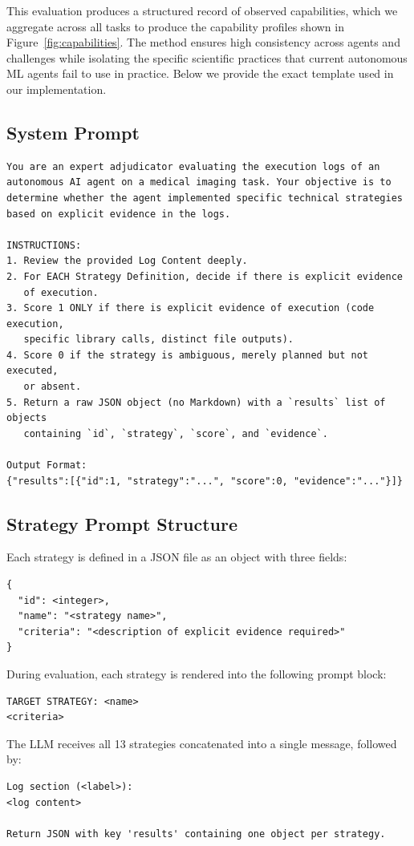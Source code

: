 This evaluation produces a structured record of observed capabilities, which we aggregate  across all tasks to produce the capability profiles shown in Figure~\ref{fig:capabilities}. The method ensures high consistency across agents and challenges while isolating the specific scientific practices that current autonomous ML agents fail to use in practice.
Below we provide the exact template used in our implementation.

\subsection{System Prompt}

\begin{verbatim}
You are an expert adjudicator evaluating the execution logs of an 
autonomous AI agent on a medical imaging task. Your objective is to 
determine whether the agent implemented specific technical strategies 
based on explicit evidence in the logs.

INSTRUCTIONS:
1. Review the provided Log Content deeply.
2. For EACH Strategy Definition, decide if there is explicit evidence 
   of execution.
3. Score 1 ONLY if there is explicit evidence of execution (code execution, 
   specific library calls, distinct file outputs).
4. Score 0 if the strategy is ambiguous, merely planned but not executed, 
   or absent.
5. Return a raw JSON object (no Markdown) with a `results` list of objects 
   containing `id`, `strategy`, `score`, and `evidence`.

Output Format:
{"results":[{"id":1, "strategy":"...", "score":0, "evidence":"..."}]}
\end{verbatim}

\subsection{Strategy Prompt Structure}

Each strategy is defined in a JSON file as an object with three fields:
\begin{verbatim}
{
  "id": <integer>,
  "name": "<strategy name>",
  "criteria": "<description of explicit evidence required>"
}
\end{verbatim}

During evaluation, each strategy is rendered into the following prompt block:
\begin{verbatim}
TARGET STRATEGY: <name>
<criteria>
\end{verbatim}

The LLM receives all 13 strategies concatenated into a single message, followed by:
\begin{verbatim}
Log section (<label>):
<log content>

Return JSON with key 'results' containing one object per strategy.
\end{verbatim}

